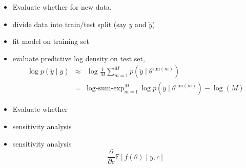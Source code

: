 \documentclass[10pt]{report}
\newcommand{\simdraw}[2]{#1^{\textrm{sim}(#2)}}
\begin{document}
\begin{itemize}
\item Evaluate whether  for new data.
\item divide data into train/test split (say $y$ and $\widetilde{y}$)
\item fit model on training set
\item evaluate predictive log density on test set,
  \begin{eqnarray*}
    \log p(\tilde{y} \mid y)
    & \approx & \log \frac{1}{M} \sum_{m=1}^M p(\tilde{y} \mid \simdraw{\theta}{m})
    \\[4pt]
    & = & \textrm{log-sum-exp}_{m=1}^M \, \log p(\tilde{y} \mid
          \simdraw{\theta}{m})
          - \log(M)
  \end{eqnarray*}
\end{itemize}

\begin{itemize}
\item Evaluate whether 
\item {} sensitivity analysis
\item {} sensitivity analysis
  \[
    \frac{\partial}{\partial c} \mathbb{E}[f(\theta) \mid y, c]
  \]
\end{itemize}  

\end{document}
